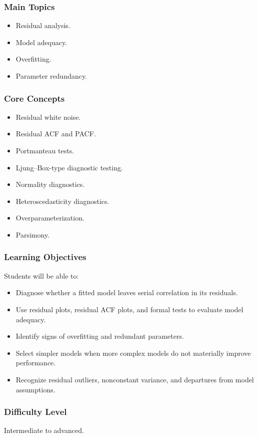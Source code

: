 \documentclass[11pt]{article}
\begin{document}
\subsubsection*{Main Topics}
\begin{itemize}
    \item Residual analysis.
    \item Model adequacy.
    \item Overfitting.
    \item Parameter redundancy.
\end{itemize}

\subsubsection*{Core Concepts}
\begin{itemize}
    \item Residual white noise.
    \item Residual ACF and PACF.
    \item Portmanteau tests.
    \item Ljung--Box-type diagnostic testing.
    \item Normality diagnostics.
    \item Heteroscedasticity diagnostics.
    \item Overparameterization.
    \item Parsimony.
\end{itemize}

\subsubsection*{Learning Objectives}
Students will be able to:
\begin{itemize}
    \item Diagnose whether a fitted model leaves serial correlation in its residuals.
    \item Use residual plots, residual ACF plots, and formal tests to evaluate model adequacy.
    \item Identify signs of overfitting and redundant parameters.
    \item Select simpler models when more complex models do not materially improve performance.
    \item Recognize residual outliers, nonconstant variance, and departures from model assumptions.
\end{itemize}

\subsubsection*{Difficulty Level}
Intermediate to advanced.
\end{document}
